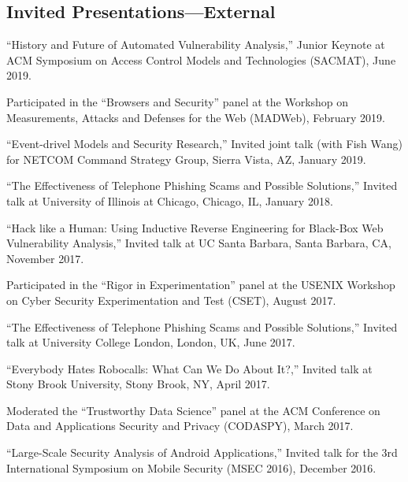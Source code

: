 \documentclass[11pt,letterpaper,sans]{moderncv}
\begin{document}
\subsection{Invited Presentations---External}

\begin{etaremune}

  \item ``History and Future of Automated Vulnerability Analysis,'' Junior Keynote at ACM Symposium on Access Control Models and Technologies (SACMAT), June 2019.

  \item Participated in the ``Browsers and Security'' panel at the Workshop on Measurements, Attacks and Defenses for the Web (MADWeb), February 2019.

  \item ``Event-drivel Models and Security Research,'' Invited joint talk (with Fish Wang) for NETCOM Command Strategy Group, Sierra Vista, AZ, January 2019.

  \item ``The Effectiveness of Telephone Phishing Scams and Possible Solutions,''
    Invited talk at University of Illinois at Chicago, Chicago, IL, January 2018.
    
  \item ``Hack like a Human: Using Inductive Reverse Engineering for Black-Box Web Vulnerability Analysis,'' Invited talk at UC Santa Barbara, Santa Barbara, CA, November 2017.

  \item Participated in the ``Rigor in Experimentation'' panel at the
    USENIX Workshop on Cyber Security Experimentation and Test (CSET),
    August 2017.

  \item ``The Effectiveness of Telephone Phishing Scams and Possible Solutions,''
    Invited talk at University College London, London, UK, June
    2017.

  \item ``Everybody Hates Robocalls: What Can We Do About It?,''
    Invited talk at Stony Brook University, Stony Brook, NY, April
    2017.

  \item Moderated the ``Trustworthy Data Science'' panel at the ACM
    Conference on Data and Applications Security and Privacy
    (CODASPY), March 2017.

  \item ``Large-Scale Security Analysis of Android Applications,''
    Invited talk for the 3rd International Symposium on Mobile
    Security (MSEC 2016), December 2016.


\end{etaremune}
\end{document}
